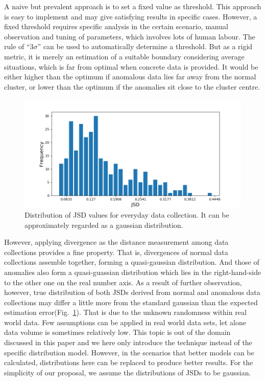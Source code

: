 \documentclass[10pt,conference,letterpaper]{IEEEtran}
\begin{document}
			A naive but prevalent approach is to set a fixed value as threshold. This approach is easy to implement and may give satisfying results in specific cases. However, a fixed threshold requires specific analysis in the certain scenario, manual observation and tuning of parameters, which involves lots of human labour. The rule of ``$3 \sigma$'' can be used to automatically determine a threshold. But as a rigid metric, it is merely an estimation of a suitable boundary considering average situations, which is far from optimal when concrete data is provided. It would be either higher than the optimum if anomalous data lies far away from the normal cluster, or lower than the optimum if the anomalies sit close to the cluster centre.
	
			\begin{figure}[!t]
				\centering
				\includegraphics[width=\linewidth]{fig/JSD-Dist.png}
				\caption{Distribution of JSD values for everyday data collection. It can be approximately regarded as a gaussian distribution.}
				\label{fig:jsd-dist}
			\end{figure}
	
			However, applying divergence as the distance measurement among data collections provides a fine property. That is, divergences of normal data collections assemble together, forming a quasi-gaussian distribution. And those of anomalies also form a quasi-guassian distribution which lies in the right-hand-side to the other one on the real number axis. As a result of further observation, however, true distribution of both JSDs derived from normal and anomalous data collections may differ a little more from the standard gaussian than the expected estimation error(Fig.~\ref{fig:jsd-dist}). That is due to the unknown randomness within real world data. Few assumptions can be applied in real world data sets, let alone data volume is sometimes relatively low. This topic is out of the domain discussed in this paper and we here only introduce the technique instead of the specific distribution model. However, in the scenarios that better models can be calculated, distributions here can be replaced to produce better results. For the simplicity of our proposal, we assume the distributions of JSDs to be gaussian.
	
\end{document}
